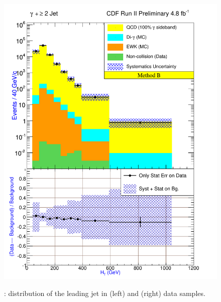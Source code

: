 \documentclass[11pt]{article}
\begin{document}
\begin{figure}[h!]
{ \includegraphics[scale=\resultsHistScale,keepaspectratio=true]{./g30jet_MtdB_plot2_Ht.pdf}
}
 \caption{: \Ht distribution of the leading jet in \phoonejet (left) and \photwojet (right) data samples.}
 \label{fig:Result_MtdB_gj1_Ht}
\end{figure}
\end{document}
